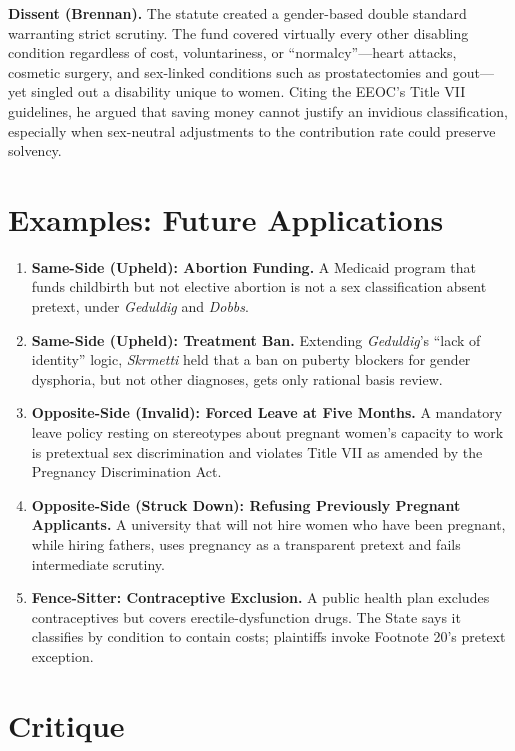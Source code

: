 \documentclass[12pt]{article}
\begin{document}
\textbf{Dissent (Brennan).} The statute created a gender-based double standard warranting strict scrutiny. The fund covered virtually every other disabling condition regardless of cost, voluntariness, or ``normalcy''---heart attacks, cosmetic surgery, and sex-linked conditions such as prostatectomies and gout---yet singled out a disability unique to women. Citing the EEOC's Title VII guidelines, he argued that saving money cannot justify an invidious classification, especially when sex-neutral adjustments to the contribution rate could preserve solvency.

\section{Examples: Future Applications}

\begin{enumerate}
\item \textbf{Same-Side (Upheld): Abortion Funding.} A Medicaid program that funds childbirth but not elective abortion is not a sex classification absent pretext, under \textit{Geduldig} and \textit{Dobbs}.
\item \textbf{Same-Side (Upheld): Treatment Ban.} Extending \textit{Geduldig}'s ``lack of identity'' logic, \textit{Skrmetti} held that a ban on puberty blockers for gender dysphoria, but not other diagnoses, gets only rational basis review.
\item \textbf{Opposite-Side (Invalid): Forced Leave at Five Months.} A mandatory leave policy resting on stereotypes about pregnant women's capacity to work is pretextual sex discrimination and violates Title VII as amended by the Pregnancy Discrimination Act.
\item \textbf{Opposite-Side (Struck Down): Refusing Previously Pregnant Applicants.} A university that will not hire women who have been pregnant, while hiring fathers, uses pregnancy as a transparent pretext and fails intermediate scrutiny.
\item \textbf{Fence-Sitter: Contraceptive Exclusion.} A public health plan excludes contraceptives but covers erectile-dysfunction drugs. The State says it classifies by condition to contain costs; plaintiffs invoke Footnote 20's pretext exception.
\end{enumerate}

\section{Critique}
\end{document}
